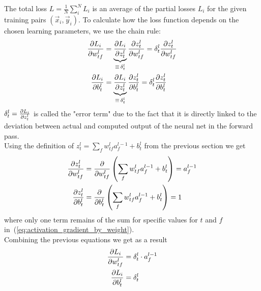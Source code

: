 The total loss $L = \frac{1}{N}\sum\limits_i^{N}{L_i}$ is an average of the partial losses
$L_i$ for the given training pairs $(\vec{x}_i, \vec{y}_i)$. To calculate how the loss
function depends on the chosen learning parameters, we use the chain rule:
\begin{subequations}
    \begin{align}
        \frac{\partial {L_i}}{\partial {w_{tf}^l}} & =
        \underbrace{\frac{\partial {L_i}}{\partial {z_t^l}}}_{\equiv\,\delta_t^l} \frac{\partial {z_t^l}}{\partial {w_{tf}^l}}
        = \delta_t^l \frac{\partial {z_t^l}}{\partial {w_{tf}^l}}
        \label{eq:loss_gradient_by_weight} \\
        \frac{\partial {L_i}}{\partial {b_t^l}} & =
        \underbrace{\frac{\partial {L_i}}{\partial {z_t^l}}}_{\equiv\,\delta_t^l} \frac{\partial {z_t^l}}{\partial {b_t^l}}
        = \delta_t^l \frac{\partial {z_t^l}}{\partial {b_t^l}}
        \label{eq:loss_gradient_by_bias}  
    \end{align}
\end{subequations}
$\delta_t^l = \frac{\partial {L_i}}{\partial {z_t^l}}$ is called the "error term" due to the fact that it is
directly linked to the deviation between actual and computed output of the neural net in
the forward pass. \\

Using the definition of $z_t^l = \sum_{f}{w^l_{tf} a^{l-1}_f} + b^l_t$
from the previous section we get
\begin{subequations}
    \begin{align}
    \frac{\partial {z_t^l}}{\partial {w^l_{tf}}} & =\frac{\partial {}}{\partial {w^l_{tf}}}\left(
        \sum\limits_{f}{w^l_{tf} a^{l-1}_f} + b^l_t
        \right) = a^{l-1}_f \label{eq:activation_gradient_by_weight} \\
    \frac{\partial {z_t^l}}{\partial {b^l_t}} & =\frac{\partial {}}{\partial {b^l_t}}\left(
        \sum\limits_{f}{w^l_{tf} a^{l-1}_f} + b^l_t
        \right) = 1 \label{eq:activation_gradient_by_bias}
\end{align}
\end{subequations}
where only one term remains of the sum for specific values for $t$ and $f$
in~(\ref{eq:activation_gradient_by_weight}). \\

Combining the previous equations we get as a result
\begin{subequations}
    \begin{align}
        \frac{\partial {L_i}}{\partial {w_{tf}^l}} & = \delta_t^l \cdot a^{l-1}_f
        \label{eq:loss_gradient_by_weight_condensed}\\
        \frac{\partial {L_i}}{\partial {b^l_t}} & = \delta_t^l
        \label{eq:loss_gradient_by_bias_condensed}
    \end{align}
\end{subequations}

